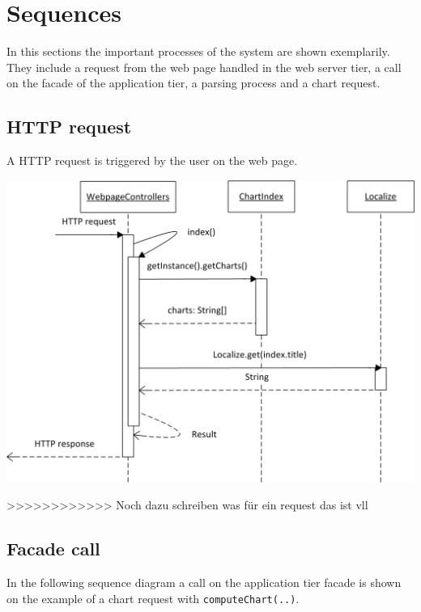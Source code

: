 \section{Sequences}
In this sections the important processes of the system are shown exemplarily. They include a request 
from the web page handled in the web server tier, a call on the facade of the application tier,
a parsing process and a chart request.

\subsection{HTTP request}
A HTTP request is triggered by the user on the web page.

\begin{center}
\includegraphics{Pictures/Seq/SeqHTTPRequest.png}
\end{center}
>>>>>>>>>>>> Noch dazu schreiben was für ein request das ist vll


\newpage 
\subsection{Facade call}
In the following sequence diagram a call on the application tier facade is shown 
on the example of a chart request with \texttt{computeChart(..)}.

